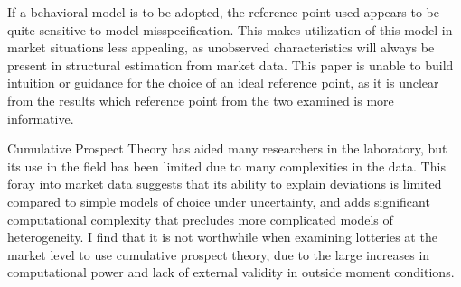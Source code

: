 \documentclass[12pt]{paper}
\newtheorem{assume}{Assumption}
\begin{document}
If a behavioral model is to be adopted, the reference point used
appears to be quite sensitive to model misspecification. This makes
utilization of this model in market situations less appealing, as
unobserved characteristics will always be present in structural
estimation from market data. This paper is unable to build intuition
or guidance for the choice of an ideal reference point, as it is
unclear from the results which reference point from the two examined
is more informative.

Cumulative Prospect Theory has aided many researchers in the
laboratory, but its use in the field has been limited due to many
complexities in the data. This foray into market data suggests that
its ability to explain deviations is limited compared to simple models
of choice under uncertainty, and adds significant computational
complexity that precludes more complicated models of heterogeneity. I
find that it is not worthwhile when examining lotteries at the market
level to use cumulative prospect theory, due to the large increases in
computational power and lack of external validity in outside moment
conditions. 






\end{document}
